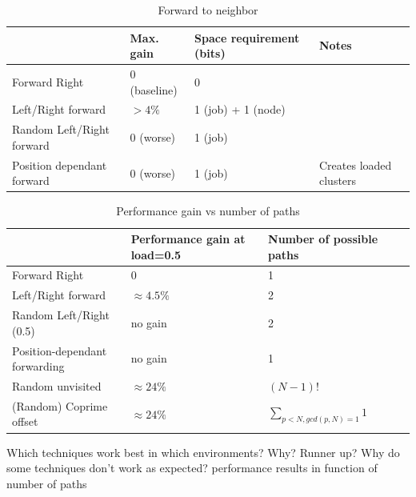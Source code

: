 \documentclass[10pt,a4paper]{article}
\begin{document}
\begin{table}[h!]
\centering
\begin{tabular}{|p{}|p{}|p{}|p{}|} \hline
							& Max. gain		& Space requirement (bits)	& Notes \\ \hline
Forward Right				& 0 (baseline)	& 0							&		\\ \hline
Left/Right forward			& $> 4\%$		& 1 (job) + 1 (node)		&		\\ \hline
Random Left/Right forward	& 0 (worse)		& 1 (job)					&		\\ \hline
Position dependant forward	& 0 (worse)		& 1 (job)					& Creates loaded clusters \\ \hline
\end{tabular}
\caption{Forward to neighbor}
\end{table}

%



\begin{table}
\centering
\begin{tabular}{|p{}|p{}|p{}|p{}|} \hline
 							& Performance gain at load=0.5	& Number of possible paths	\\ \hline
Forward Right				& 0								& 1							\\ \hline
Left/Right forward			& $\approx 4.5\%$				& 2							\\ \hline
Random Left/Right (0.5)		& no gain						& 2							\\ \hline
Position-dependant forwarding & no gain						& 1							\\ \hline
Random unvisited			& $\approx 24\%$						& $(N-1)!$					\\ \hline
(Random) Coprime offset		& $\approx 24\%$						& $\sum_{p < N,gcd(p, N) = 1} 1$ \\ \hline
\end{tabular}
\caption{Performance gain vs number of paths}
\end{table}

Which techniques work best in which environments? Why? Runner up? Why do some techniques don't work as expected? performance results in function of number of paths
\end{document}
